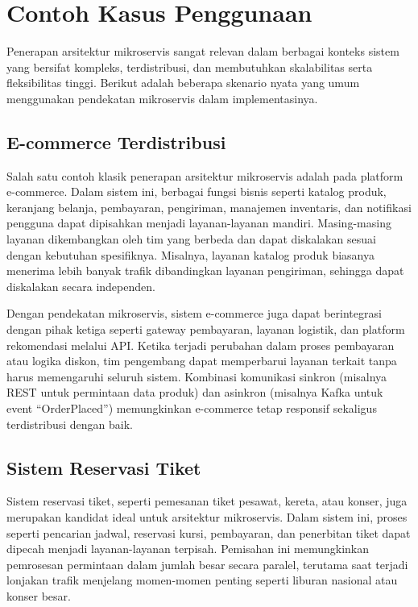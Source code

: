 \section{Contoh Kasus Penggunaan}

Penerapan arsitektur mikroservis sangat relevan dalam berbagai konteks sistem yang bersifat kompleks, terdistribusi, dan membutuhkan skalabilitas serta fleksibilitas tinggi. Berikut adalah beberapa skenario nyata yang umum menggunakan pendekatan mikroservis dalam implementasinya.

\subsection{E-commerce Terdistribusi}

Salah satu contoh klasik penerapan arsitektur mikroservis adalah pada platform e-commerce. Dalam sistem ini, berbagai fungsi bisnis seperti katalog produk, keranjang belanja, pembayaran, pengiriman, manajemen inventaris, dan notifikasi pengguna dapat dipisahkan menjadi layanan-layanan mandiri. Masing-masing layanan dikembangkan oleh tim yang berbeda dan dapat diskalakan sesuai dengan kebutuhan spesifiknya. Misalnya, layanan katalog produk biasanya menerima lebih banyak trafik dibandingkan layanan pengiriman, sehingga dapat diskalakan secara independen.

Dengan pendekatan mikroservis, sistem e-commerce juga dapat berintegrasi dengan pihak ketiga seperti gateway pembayaran, layanan logistik, dan platform rekomendasi melalui API. Ketika terjadi perubahan dalam proses pembayaran atau logika diskon, tim pengembang dapat memperbarui layanan terkait tanpa harus memengaruhi seluruh sistem. Kombinasi komunikasi sinkron (misalnya REST untuk permintaan data produk) dan asinkron (misalnya Kafka untuk event “OrderPlaced”) memungkinkan e-commerce tetap responsif sekaligus terdistribusi dengan baik.

\subsection{Sistem Reservasi Tiket}

Sistem reservasi tiket, seperti pemesanan tiket pesawat, kereta, atau konser, juga merupakan kandidat ideal untuk arsitektur mikroservis. Dalam sistem ini, proses seperti pencarian jadwal, reservasi kursi, pembayaran, dan penerbitan tiket dapat dipecah menjadi layanan-layanan terpisah. Pemisahan ini memungkinkan pemrosesan permintaan dalam jumlah besar secara paralel, terutama saat terjadi lonjakan trafik menjelang momen-momen penting seperti liburan nasional atau konser besar.


